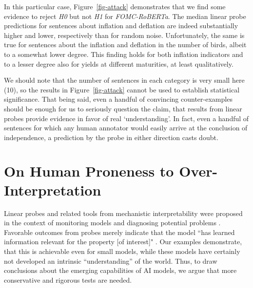\documentclass{article}
\theoremstyle{plain}
\theoremstyle{definition}
\theoremstyle{remark}
\begin{document}
In this particular case, Figure~\ref{fig-attack} demonstrates that we find some evidence to reject \emph{H0} but not \emph{H1} for \emph{FOMC-RoBERTa}. The median linear probe predictions for sentences about inflation and deflation are indeed substantially higher and lower, respectively than for random noise. Unfortunately, the same is true for sentences about the inflation and deflation in the number of birds, albeit to a somewhat lower degree. This finding holds for both inflation indicators and to a lesser degree also for yields at different maturities, at least qualitatively.

We should note that the number of sentences in each category is very small here (10), so the results in Figure~\ref{fig-attack} cannot be used to establish statistical significance. That being said, even a handful of convincing counter-examples should be enough for us to seriously question the claim, that results from linear probes provide evidence in favor of real `understanding'. In fact, even a handful of sentences for which any human annotator would easily arrive at the conclusion of independence, a prediction by the probe in either direction casts doubt.

\section{On Human Proneness to Over-Interpretation}
Linear probes and related tools from mechanistic interpretability were proposed in the context of monitoring models and diagnosing potential problems \citep{alain2018understanding}. Favorable outcomes from probes merely indicate that the model ``has learned information relevant for the property [of interest]" \citep{belinkov2021probing}. Our examples demonstrate, that this is achievable even for small models, while these models have certainly not developed an intrinsic ``understanding'' of the world. Thus, to draw conclusions about the emerging capabilities of AI models, we argue that more conservative and rigorous tests are needed.

\end{document}
